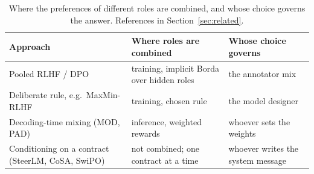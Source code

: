 \documentclass[letterpaper]{article} %
\begin{document}
\begin{table}[t]
\centering
\small
\setlength{\tabcolsep}{2pt}
\begin{tabular}{@{}>{\raggedright\arraybackslash}p{0.95in}>{\raggedright\arraybackslash}p{0.95in}>{\raggedright\arraybackslash}p{1.25in}@{}}
\toprule
Approach & Where roles are combined & Whose choice governs \\
\midrule
Pooled RLHF / DPO & training, implicit Borda over hidden roles & the annotator mix \\
Deliberate rule, e.g.\ MaxMin-RLHF & training, chosen rule & the model designer \\
Decoding-time mixing (MOD, PAD) & inference, weighted rewards & whoever sets the weights \\
Conditioning on a contract (SteerLM, CoSA, SwiPO) & not combined; one contract at a time & whoever writes the system message \\
\bottomrule
\end{tabular}
\caption{Where the preferences of different roles are combined, and whose choice governs the answer. References in Section~\ref{sec:related}.}
\label{tab:where}
\end{table}
\end{document}
